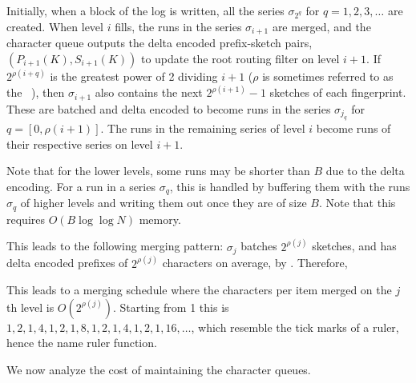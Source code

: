 Initially, when a block of the log is written, all the series $\sigma_{2^q}$
for $q=1,2,3,\ldots$ are created. When level $i$ fills, the runs in the series
$\sigma_{i+1}$ are merged, and the character queue outputs the delta encoded
prefix-sketch pairs, $(P_{i+1}(K),S_{i+1}(K))$ to update the root routing
filter on level $i+1$. If $2^{\rho(i+q)}$ is the greatest power of 2 dividing
$i+1$ ($\rho$ is sometimes referred to as the ~\cite{wiki:Thomae's_function}), then $\sigma_{i+1}$ also contains the
next $2^{\rho(i+1)}-1$ sketches of each fingerprint. These are batched and
delta encoded to become runs in the series $\sigma_{j_q}$ for $q =
[0,\rho(i+1)]$. The runs in the remaining series of level $i$ become runs of
their respective series on level $i+1$.

Note that for the lower levels, some runs may be shorter than $B$ due to the
delta encoding. For a run in a series $\sigma_q$, this is handled by buffering
them with the runs $\sigma_q$ of higher levels and writing them out once they
are of size $B$. Note that this requires $O(B\log\log N)$ memory.

This leads to the following merging pattern: $\sigma_j$ batches $2^{\rho(j)}$
sketches, and has delta encoded prefixes of $2^{\rho(j)}$ characters on average,
by . Therefore,


This leads to a merging schedule where the characters per item merged on the
$j$th level is $O(2^{\rho(j)})$. Starting from 1 this is
$1,2,1,4,1,2,1,8,1,2,1,4,1,2,1,16,\ldots$, which resemble the tick marks of a
ruler, hence the name ruler function.

We now analyze the cost of maintaining the character queues.


